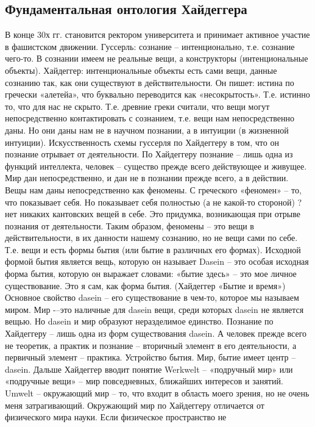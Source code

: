 \documentclass[12pt]{article}
\begin{document}
\subsection{Фундаментальная онтология Хайдеггера}
В конце 30х гг. становится ректором университета и принимает активное участие в фашистском движении.
Гуссерль:  сознание  –  интенционально,  т.е.  сознание  чего-то.  В  сознании  имеем  не  реальные  вещи,  а
конструкторы (интенциональные объекты).
Хайдеггер:  интенциональные  объекты  есть  сами  вещи,  данные  сознанию  так,  как  они  существуют  в
действительности.
Он пишет: истина по гречески «алетейа», что буквально переводится как «несокрытость». Т.е. истинно то, что
для нас не скрыто. Т.е. древние греки считали, что вещи могут непосредственно контактировать с сознанием,
т.е. вещи нам непосредственно даны. Но они даны нам не в научном познании, а в интуиции (в жизненной
интуиции).
Искусственность  схемы  гуссерля  по  Хайдеггеру  в  том,  что  он  познание  отрывает  от  деятельности.  По
Хайдеггеру познание – лишь одна из функций интеллекта, человек – существо прежде всего действующее и
живущее. Мир дан непосредственно, и дан не в познании прежде всего, а в действии.
Вещы  нам  даны  непосредственно  как  феномены.  С  греческого  «феномен»  –  то,  что  показывает  себя.  Но
показывает себя полностью (а не какой-то стороной) ? нет никаких кантовских вещей в себе. Это придумка,
возникающая при отрыве познания от деятельности.
Таким образом, феномены – это вещи в действительности, в их данности нашему сознанию, но не вещи сами по
себе. Т.е. вещи и есть формы бытия (или бытие в различных его формах).
Исходной формой бытия является вещь, которую он называет Dasein – это особая исходная форма бытия,
которую он выражает словами: «бытие здесь» – это мое личное существование. Это я сам, как форма бытия.
(Хайдеггер «Бытие и время»)
Основное свойство dasein – его существование в чем-то, которое мы называем миром. Мир -–это наличные для
dasein вещи, среди которых dasein не является вещью. Но dasein и мир образуют неразделимое единство.
Познание по Хайдеггеру – лишь одна из форм существования dasein. А человек прежде всего не теоретик, а
практик и познание – вторичный элемент в его деятельности, а первичный элемент – практика.
Устройство бытия.
Мир, бытие имеет центр – dasein.
Дальше Хайдеггер вводит понятие Werkwelt – «подручный мир» или «подручные вещи» – мир повседневных,
ближайших интересов и занятий. Umwelt – окружающий мир – то, что входит в область моего зрения, но не
очень меня затрагивающий.
Окружающий мир по Хайдеггеру отличается от физического мира науки. Если физическое пространство не
\end{document}

